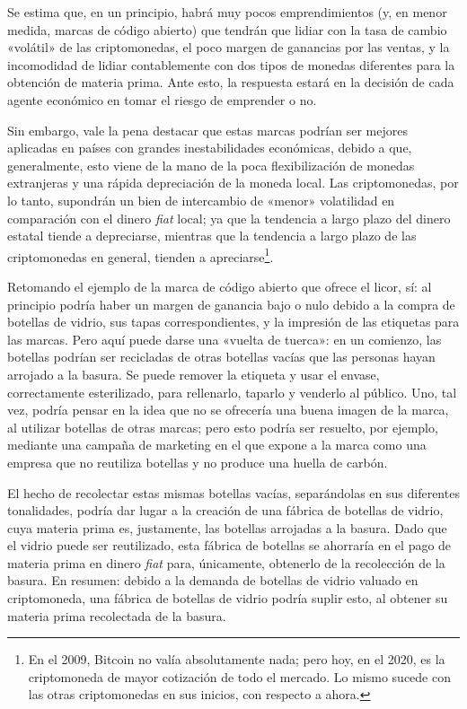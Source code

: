 \documentclass[12pt,a4paper]{article}
\begin{document}
Se estima que, en un principio, habrá muy pocos emprendimientos (y, en menor medida, marcas de código abierto) que tendrán que lidiar con la tasa de cambio «volátil» de las criptomonedas, el poco margen de ganancias por las ventas, y la incomodidad de lidiar contablemente con dos tipos de monedas diferentes para la obtención de materia prima. Ante esto, la respuesta estará en la decisión de cada agente económico en tomar el riesgo de emprender o no.

Sin embargo, vale la pena destacar que estas marcas podrían ser mejores aplicadas en países con grandes inestabilidades económicas, debido a que, generalmente, esto viene de la mano de la poca flexibilización de monedas extranjeras y una rápida depreciación de la moneda local. Las criptomonedas, por lo tanto, supondrán un bien de intercambio de «menor» volatilidad en comparación con el dinero \textit{fiat} local; ya que la tendencia a largo plazo del dinero estatal tiende a depreciarse, mientras que la tendencia a largo plazo de las criptomonedas en general, tienden a apreciarse\footnote{En el 2009, Bitcoin no valía absolutamente nada; pero hoy, en el 2020, es la criptomoneda de mayor cotización de todo el mercado. Lo mismo sucede con las otras criptomonedas en sus inicios, con respecto a ahora.}.

Retomando el ejemplo de la marca de código abierto que ofrece el licor, sí: al principio podría haber un margen de ganancia bajo o nulo debido a la compra de botellas de vidrio, sus tapas correspondientes, y la impresión de las etiquetas para las marcas. Pero aquí puede darse una «vuelta de tuerca»: en un comienzo, las botellas podrían ser recicladas de otras botellas vacías que las personas hayan arrojado a la basura. Se puede remover la etiqueta y usar el envase, correctamente esterilizado, para rellenarlo, taparlo y venderlo al público. Uno, tal vez, podría pensar en la idea que no se ofrecería una buena imagen de la marca, al utilizar botellas de otras marcas; pero esto podría ser resuelto, por ejemplo, mediante una campaña de marketing en el que expone a la marca como una empresa que no reutiliza botellas y no produce una huella de carbón.

El hecho de recolectar estas mismas botellas vacías, separándolas en sus diferentes tonalidades, podría dar lugar a la creación de una fábrica de botellas de vidrio, cuya materia prima es, justamente, las botellas arrojadas a la basura. Dado que el vidrio puede ser reutilizado, esta fábrica de botellas se ahorraría en el pago de materia prima en dinero \textit{fiat} para, únicamente, obtenerlo de la recolección de la basura. En resumen: debido a la demanda de botellas de vidrio valuado en criptomoneda, una fábrica de botellas de vidrio podría suplir esto, al obtener su materia prima recolectada de la basura.
\end{document}
